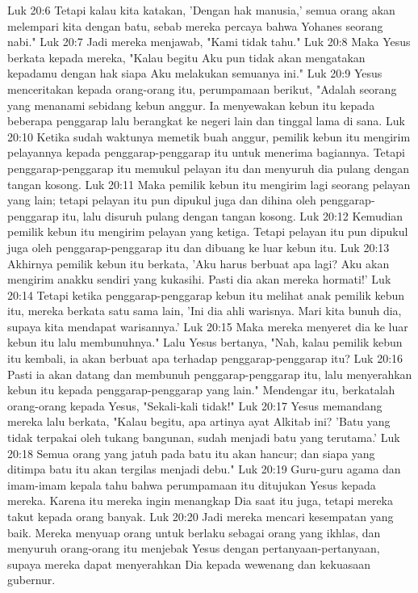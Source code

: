 Luk 20:6  Tetapi kalau kita katakan, 'Dengan hak manusia,' semua orang akan melempari kita dengan batu, sebab mereka percaya bahwa Yohanes seorang nabi."
Luk 20:7  Jadi mereka menjawab, "Kami tidak tahu."
Luk 20:8  Maka Yesus berkata kepada mereka, "Kalau begitu Aku pun tidak akan mengatakan kepadamu dengan hak siapa Aku melakukan semuanya ini."
Luk 20:9  Yesus menceritakan kepada orang-orang itu, perumpamaan berikut, "Adalah seorang yang menanami sebidang kebun anggur. Ia menyewakan kebun itu kepada beberapa penggarap lalu berangkat ke negeri lain dan tinggal lama di sana.
Luk 20:10  Ketika sudah waktunya memetik buah anggur, pemilik kebun itu mengirim pelayannya kepada penggarap-penggarap itu untuk menerima bagiannya. Tetapi penggarap-penggarap itu memukul pelayan itu dan menyuruh dia pulang dengan tangan kosong.
Luk 20:11  Maka pemilik kebun itu mengirim lagi seorang pelayan yang lain; tetapi pelayan itu pun dipukul juga dan dihina oleh penggarap-penggarap itu, lalu disuruh pulang dengan tangan kosong.
Luk 20:12  Kemudian pemilik kebun itu mengirim pelayan yang ketiga. Tetapi pelayan itu pun dipukul juga oleh penggarap-penggarap itu dan dibuang ke luar kebun itu.
Luk 20:13  Akhirnya pemilik kebun itu berkata, 'Aku harus berbuat apa lagi? Aku akan mengirim anakku sendiri yang kukasihi. Pasti dia akan mereka hormati!'
Luk 20:14  Tetapi ketika penggarap-penggarap kebun itu melihat anak pemilik kebun itu, mereka berkata satu sama lain, 'Ini dia ahli warisnya. Mari kita bunuh dia, supaya kita mendapat warisannya.'
Luk 20:15  Maka mereka menyeret dia ke luar kebun itu lalu membunuhnya." Lalu Yesus bertanya, "Nah, kalau pemilik kebun itu kembali, ia akan berbuat apa terhadap penggarap-penggarap itu?
Luk 20:16  Pasti ia akan datang dan membunuh penggarap-penggarap itu, lalu menyerahkan kebun itu kepada penggarap-penggarap yang lain." Mendengar itu, berkatalah orang-orang kepada Yesus, "Sekali-kali tidak!"
Luk 20:17  Yesus memandang mereka lalu berkata, "Kalau begitu, apa artinya ayat Alkitab ini? 'Batu yang tidak terpakai oleh tukang bangunan, sudah menjadi batu yang terutama.'
Luk 20:18  Semua orang yang jatuh pada batu itu akan hancur; dan siapa yang ditimpa batu itu akan tergilas menjadi debu."
Luk 20:19  Guru-guru agama dan imam-imam kepala tahu bahwa perumpamaan itu ditujukan Yesus kepada mereka. Karena itu mereka ingin menangkap Dia saat itu juga, tetapi mereka takut kepada orang banyak.
Luk 20:20  Jadi mereka mencari kesempatan yang baik. Mereka menyuap orang untuk berlaku sebagai orang yang ikhlas, dan menyuruh orang-orang itu menjebak Yesus dengan pertanyaan-pertanyaan, supaya mereka dapat menyerahkan Dia kepada wewenang dan kekuasaan gubernur.
